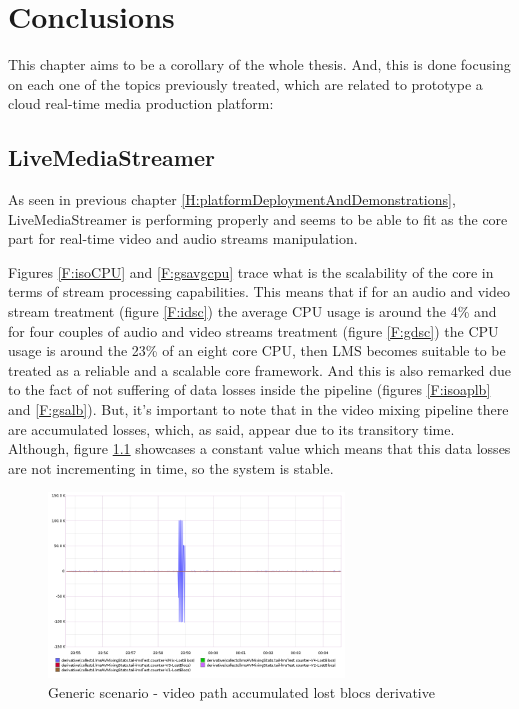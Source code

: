 \chapter{Conclusions}\label{C:conclusions}

This chapter aims to be a corollary of the whole thesis. And, this is done focusing on each one of the topics previously treated, which are related to prototype a cloud real-time media production platform:

\section{LiveMediaStreamer}

As seen in previous chapter \ref{H:platformDeploymentAndDemonstrations}, LiveMediaStreamer is performing properly and seems to be able to fit as the core part for real-time video and audio streams manipulation.

Figures \ref{F:isoCPU} and \ref{F:gsavgcpu} trace what is the scalability of the core in terms of stream processing capabilities. This means that if for an audio and video stream treatment (figure \ref{F:idsc}) the average CPU usage is around the 4\% and for four couples of audio and video streams treatment (figure \ref{F:gdsc}) the CPU usage is around the 23\% of an eight core CPU, then LMS becomes suitable to be treated as a reliable and a scalable core framework. And this is also remarked due to the fact of not suffering of data losses inside the pipeline (figures \ref{F:isoaplb} and \ref{F:gsalb}). But, it's important to note that in the video mixing pipeline there are accumulated losses, which, as said, appear due to its transitory time. Although, figure \ref{F:gsvpalbd} showcases a constant value which means that this data losses are not incrementing in time, so the system is stable.

\begin{figure}[!htb]
\begin{center}
\includegraphics[width=0.70\textwidth]{./images/testAVMix/AVMixVideoLostBlocsDerivative.png}
\caption{Generic scenario - video path accumulated lost blocs derivative}
\label{F:gsvpalbd}
\end{center}
\end{figure}

